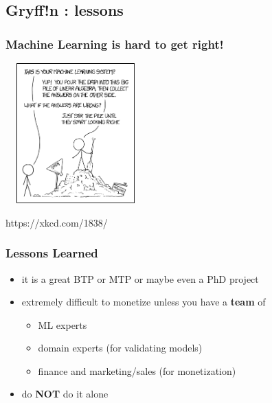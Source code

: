 \documentclass{beamer}
\begin{document}
\subsection{Gryff!n : lessons}
\begin{frame}
  \frametitle{Machine Learning is hard to get right!}
  \includegraphics[height=5.4cm,width=5.4cm]{machine_learning.png}

https://xkcd.com/1838/
\end{frame}
\begin{frame}
  \frametitle{Lessons Learned}
  \begin{itemize}
  \item it is a great BTP or MTP or maybe even a PhD project
  \item extremely difficult to monetize unless you have a \textbf{team} of
    \begin{itemize}
    \item ML experts
    \item domain experts (for validating models)
    \item finance and marketing/sales (for monetization)
    \end{itemize}
  \item<2-> do \textbf{NOT} do it alone
  \end{itemize}
\end{frame}

\end{document}
